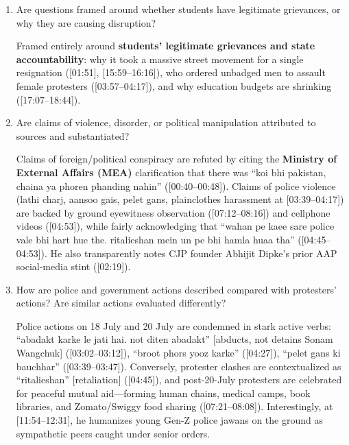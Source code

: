 \documentclass[10pt,a4paper]{article}
\begin{document}
{\begin{enumerate}[leftmargin=1.5em, itemsep=6pt, topsep=4pt]
  Primary responsibility is assigned to the \textbf{Union \& State Governments} (for reactive ``ditrens baay phiyar'' instead of preventive exam reforms and for slashing education spending in favor of electoral ``phri bis'' [freebies], [16:34--18:53]), \textbf{Delhi Police \& unbadged plainclothes men} for the 20 July crackdown ([03:39--04:17]), \textbf{Central Universities} (DU, JNU, Jamia, IITs) for issuing circulars threatening students with legal action ([15:00--15:20]), and \textbf{mainstream TV anchors} for vilifying youth ([05:31--05:56], [21:56--23:30]).
  \item Are questions framed around whether students have legitimate grievances, or why they are causing disruption?\par\smallskip
  Framed entirely around \textbf{students' legitimate grievances and state accountability}: why it took a massive street movement for a single resignation ([01:51], [15:59--16:16]), who ordered unbadged men to assault female protesters ([03:57--04:17]), and why education budgets are shrinking ([17:07--18:44]).
  \item Are claims of violence, disorder, or political manipulation attributed to sources and substantiated?\par\smallskip
  Claims of foreign/political conspiracy are refuted by citing the \textbf{Ministry of External Affairs (MEA)} clarification that there was ``koi bhi pakistan, chaina ya phoren phanding nahin'' ([00:40--00:48]). Claims of police violence (lathi charj, aansoo gais, pelet gans, plainclothes harassment at [03:39--04:17]) are backed by ground eyewitness observation ([07:12--08:16]) and cellphone videos ([04:53]), while fairly acknowledging that ``wahan pe kaee sare police vale bhi hart hue the. ritalieshan mein un pe bhi hamla huaa tha'' ([04:45--04:53]). He also transparently notes CJP founder Abhijit Dipke's prior AAP social-media stint ([02:19]).
  \item How are police and government actions described compared with protesters' actions? Are similar actions evaluated differently?\par\smallskip
  Police actions on 18 July and 20 July are condemned in stark active verbs: ``abadakt karke le jati hai. not diten abadakt'' [abducts, not detains Sonam Wangchuk] ([03:02--03:12]), ``broot phors yooz karke'' ([04:27]), ``pelet gans ki bauchhar'' ([03:39--03:47]). Conversely, protester clashes are contextualized as ``ritalieshan'' [retaliation] ([04:45]), and post-20-July protesters are celebrated for peaceful mutual aid---forming human chains, medical camps, book libraries, and Zomato/Swiggy food sharing ([07:21--08:08]). Interestingly, at [11:54--12:31], he humanizes young Gen-Z police jawans on the ground as sympathetic peers caught under senior orders.

\end{enumerate}}
\end{document}
